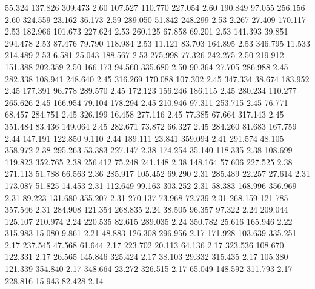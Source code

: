   55.324  137.826  309.473         2.60
 107.527  110.770  227.054         2.60
 190.849   97.055  256.156         2.60
 324.559   23.162   36.173         2.59
 289.050   51.842  248.299         2.53
   2.267   27.409  170.117         2.53
 182.966  101.673  227.624         2.53
 260.125   67.858   69.201         2.53
 141.393   39.851  294.478         2.53
  87.476   79.790  118.984         2.53
  11.121   83.703  164.895         2.53
 346.795   11.533  214.489         2.53
   6.581   25.043  188.567         2.53
 275.998   77.326  242.275         2.50
 219.912  151.388  202.359         2.50
 166.173   94.560  335.680         2.50
  90.364   27.705  286.988         2.45
 282.338  108.941  248.640         2.45
 316.269  170.088  107.302         2.45
 347.334   38.674  183.952         2.45
 177.391   96.778  289.570         2.45
 172.123  156.246  186.115         2.45
 280.234  110.277  265.626         2.45
 166.954   79.104  178.294         2.45
 210.946   97.311  253.715         2.45
  76.771   68.457  284.751         2.45
 326.199   16.458  277.116         2.45
  77.385   67.664  317.143         2.45
 351.484   83.436  149.064         2.45
 282.671   73.872   66.327         2.45
 284.260   81.683  167.759         2.44
 147.191  122.850    9.110         2.44
 189.111   23.841  359.094         2.41
 291.574   48.105  358.972         2.38
 295.263   53.383  227.147         2.38
 174.254   35.140  118.335         2.38
 108.699  119.823  352.765         2.38
 256.412   75.248  241.148         2.38
 148.164   57.606  227.525         2.38
 271.113   51.788   66.563         2.36
 285.917  105.452   69.290         2.31
 285.489   22.257   27.614         2.31
 173.087   51.825   14.453         2.31
 112.649   99.163  303.252         2.31
  58.383  168.996  356.969         2.31
  89.223  131.680  355.207         2.31
 270.137   73.968   72.739         2.31
 268.159  121.785  357.546         2.31
 284.908  121.354  268.835         2.24
  38.505   96.357   97.322         2.24
 209.044  125.107  210.974         2.24
 220.535   82.615  289.035         2.24
 350.782   25.616  165.946         2.22
 315.983   15.080    9.861         2.21
  48.883  126.308  296.956         2.17
 171.928  103.639  335.251         2.17
 237.545   47.568   61.644         2.17
 223.702   20.113   64.136         2.17
 323.536  108.670  122.331         2.17
  26.565  145.846  325.424         2.17
  38.103   29.332  315.435         2.17
 105.380  121.339  354.840         2.17
 348.664   23.272  326.515         2.17
  65.049  148.592  311.793         2.17
 228.816   15.943   82.428         2.14
